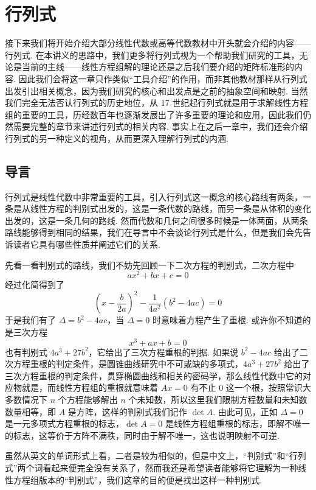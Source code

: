 \chapter{行列式}

接下来我们将开始介绍大部分线性代数或高等代数教材中开头就会介绍的内容——行列式. 在本讲义的思路中，我们更多将行列式视为一个帮助我们研究的工具，无论是当前的主线——线性方程组解的理论还是之后我们要介绍的矩阵标准形的内容. 因此我们会将这一章只作类似``工具介绍''的作用，而非其他教材那样从行列式出发引出相关概念，因为我们研究的核心和出发点是之前的抽象空间和映射. 当然我们完全无法否认行列式的历史地位，从 17 世纪起行列式就是用于求解线性方程组的重要的工具，历经数百年也逐渐发展出了许多重要的理论和应用，因此我们仍然需要完整的章节来讲述行列式的相关内容. 事实上在之后一章中，我们还会介绍行列式的另一种定义的视角，从而更深入理解行列式的内涵.

\section{导言}

行列式是线性代数中非常重要的工具，引入行列式这一概念的核心路线有两条，一条是从线性方程的判别式出发的，这是一条代数的路线，而另一条是从体积的变化出发的，这是一条几何的路线. 然而代数和几何之间很多时候是一体两面，从两条路线能够得到相同的结果，我们在导言中不会谈论行列式是什么，但是我们会先告诉读者它具有哪些性质并阐述它们的关系.

先看一看判别式的路线，我们不妨先回顾一下二次方程的判别式，二次方程中
\[
ax^2 + bx + c = 0
\]
经过化简得到了
\[
\left(x- \frac{b}{2a}\right)^2 - \frac1{4a^2}(b^2 - 4ac) = 0
\]
于是我们有了 $\Delta = b^2 - 4ac$，当 $\Delta = 0$ 时意味着方程产生了重根. 或许你不知道的是三次方程
\[
x^3+ax+b=0
\]
也有判别式 $4a^3 + 27b^2$，它给出了三次方程重根的判据. 如果说 $b^2 - 4ac$ 给出了二次方程重根的判定条件，是圆锥曲线研究中不可或缺的多项式，$4a^3+27b^2$ 给出了三次方程重根的判定条件，贯穿椭圆曲线和相关的密码学，那么线性代数中它的对应物就是，而线性方程组的重根就意味着 $Ax=0$ 有不止 $0$ 这一个根，按照常识大多数情况下 $n$ 个方程能够解出 $n$ 个未知数，所以这里我们限制方程数量和未知数数量相等，即 $A$ 是方阵，这样的判别式我们记作 $\det A$. 由此可见，正如 $\Delta = 0$ 是一元多项式方程重根的标志，$\det A = 0$ 是线性方程组重根的标志，即解不唯一的标志，这等价于方阵不满秩，同时由于解不唯一，这也说明映射不可逆.

虽然从英文的单词形式上看，二者是较为相似的，但是中文上，``判别式''和``行列式''两个词看起来便完全没有关系了，然而我还是希望读者能够将它理解为一种线性方程组版本的``判别式''，我们这章的目的便是找出这样一种判别式.

